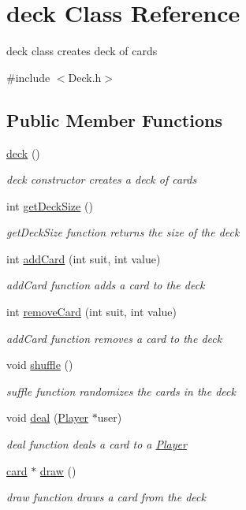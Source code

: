 \hypertarget{classdeck}{}\section{deck Class Reference}
\label{classdeck}


deck class creates deck of cards  




{\ttfamily \#include $<$Deck.\+h$>$}

\subsection*{Public Member Functions}
\begin{DoxyCompactItemize}
\item 
\hyperlink{classdeck_a2ff8465ba7b13201bdf650fe461b442e}{deck} ()
\begin{DoxyCompactList}\small\item\em deck constructor creates a deck of cards \end{DoxyCompactList}\item 
int \hyperlink{classdeck_ada0bdbb4dcd27f39db797925ac0c11ce}{get\+Deck\+Size} ()
\begin{DoxyCompactList}\small\item\em get\+Deck\+Size function returns the size of the deck \end{DoxyCompactList}\item 
int \hyperlink{classdeck_a12c0517bc9926f407aee8262ace72bf8}{add\+Card} (int suit, int value)
\begin{DoxyCompactList}\small\item\em add\+Card function adds a card to the deck \end{DoxyCompactList}\item 
int \hyperlink{classdeck_a4c60464da694301c1b7b4275bae0b384}{remove\+Card} (int suit, int value)
\begin{DoxyCompactList}\small\item\em add\+Card function removes a card to the deck \end{DoxyCompactList}\item 
void \hyperlink{classdeck_ae872ff1a6f7424f002cdf7e51988128d}{shuffle} ()
\begin{DoxyCompactList}\small\item\em suffle function randomizes the cards in the deck \end{DoxyCompactList}\item 
void \hyperlink{classdeck_a6cf31d4e598d0c5b1aa8588eaeacea7c}{deal} (\hyperlink{classPlayer}{Player} $\ast$user)
\begin{DoxyCompactList}\small\item\em deal function deals a card to a \hyperlink{classPlayer}{Player} \end{DoxyCompactList}\item 
\hyperlink{classcard}{card} $\ast$ \hyperlink{classdeck_ad99960c3630e78a74612765b01c21b61}{draw} ()
\begin{DoxyCompactList}\small\item\em draw function draws a card from the deck \end{DoxyCompactList}\end{DoxyCompactItemize}
